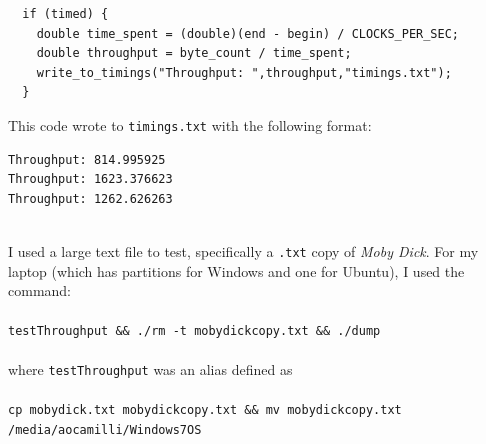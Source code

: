 \documentclass[10pt]{article}
\begin{document}
\begin{enumerate}
\begin{verbatim}
  if (timed) {
    double time_spent = (double)(end - begin) / CLOCKS_PER_SEC;
    double throughput = byte_count / time_spent;
    write_to_timings("Throughput: ",throughput,"timings.txt");
  }
\end{verbatim}
This code wrote to \texttt{timings.txt} with the following format: 
\begin{verbatim}
Throughput: 814.995925
Throughput: 1623.376623
Throughput: 1262.626263
\end{verbatim}\\
I used a large text file to test, specifically a \texttt{.txt} copy of \textit{Moby Dick}. For my laptop (which has partitions for Windows and one for Ubuntu), I used the command: \\ \\
\texttt{testThroughput \&\& ./rm -t mobydickcopy.txt \&\& ./dump} \\ \\
where \texttt{testThroughput} was an alias defined as \\ \\
\texttt{cp mobydick.txt mobydickcopy.txt \&\& mv mobydickcopy.txt /media/aocamilli/Windows7OS} \\ \\


 
\end{enumerate}
\newpage
\end{document}
